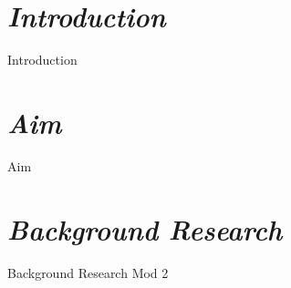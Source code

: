\documentclass[12pt, a4paper]{report}
\begin{document}
\maketitle

\tableofcontents
\clearpage



\begin{abstract}
    {Abstract}
\end{abstract}



\chapter{\textit{Introduction}}
        
        {Introduction}
        
\chapter{\textit{Aim}}
        
        {Aim}
        
        
        
        
        
        
        
\chapter{\textit{Background Research}}
        
        {Background Research Mod 2}
        
\end{document}
